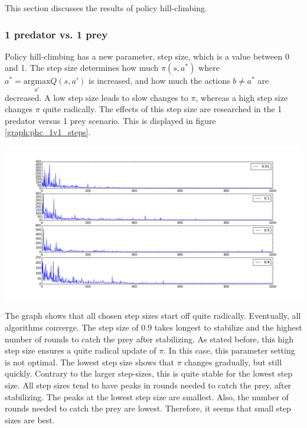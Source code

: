 This section discusses the results of policy hill-climbing.

\subsubsection{1 predator vs. 1 prey}
Policy hill-climbing has a new parameter, step size, which is a value between 0 and 1. The step size determines how much $\pi(s,a^*)$ where $a^* = \underset{a'}{\text{argmax}} Q(s,a')$ is increased, and how much the actions $b \not= a^*$ are decreased. A low step size leads to slow changes to $\pi$, whereas a high step size changes $\pi$ quite radically. The effects of this step size are researched in the 1 predator versus 1 prey scenario. This is displayed in figure \ref{graph:phc_1v1_steps}.

\begin{center}
	\includegraphics[scale=0.3]{allplots_hillclimbing}
	\label{graph:phc_1v1_steps}
\end{center}

The graph shows that all chosen step sizes start off quite radically. Eventually, all algorithms converge. The step size of 0.9 takes longest to stabilize and the highest number of rounds to catch the prey after stabilizing. As stated before, this high step size ensures a quite radical update of $\pi$. In this case, this parameter setting is not optimal. The lowest step size shows that $\pi$ changes gradually, but still quickly. Contrary to the larger step-sizes, this is quite stable for the lowest step size. All step sizes tend to have peaks in rounds needed to catch the prey, after stabilizing. The peaks at the lowest step size are smallest. Also, the number of rounds needed to catch the prey are lowest. Therefore, it seems that small step sizes are best.

